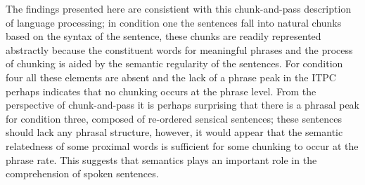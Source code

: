 \documentclass[a4paper,10pt,twoside]{article}
\begin{document}
The findings presented here are consistient with this chunk-and-pass
description of language processing; in condition one the sentences
fall into natural chunks based on the syntax of the sentence, these
chunks are readily represented abstractly because the constituent
words for meaningful phrases and the process of chunking is aided by
the semantic regularity of the sentences. For condition four all these
elements are absent and the lack of a phrase peak in the ITPC perhaps
indicates that no chunking occurs at the phrase level. From the
perspective of chunk-and-pass it is perhaps surprising that there is a
phrasal peak for condition three, composed of re-ordered sensical
sentences; these sentences should lack any phrasal structure, however,
it would appear that the semantic relatedness of some proximal words
is sufficient for some chunking to occur at the phrase rate. This
suggests that semantics plays an important role in the comprehension of
spoken sentences.

\end{document}
